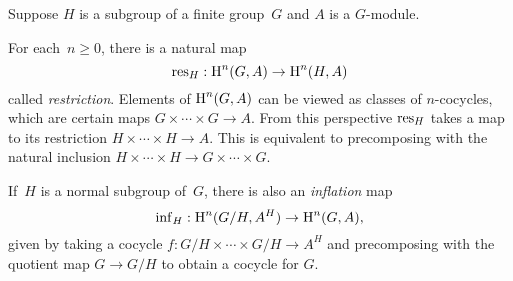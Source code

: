 Suppose $H$ is a subgroup of a finite group~$G$ and $A$
is a $G$-module.

For each~$n\geq 0$, there is a natural map
$$
	\operatorname{res}_H : \operatorname{H}^n(G,A) \to \operatorname{H}^n(H,A)
$$
called \emph{restriction}. Elements of $\operatorname{H}^n(G,A)$ can be
viewed as classes of $n$-cocycles, which are certain maps
$G \times \cdots \times G \to A$. From this perspective $\operatorname{res}_H$
takes a map to its restriction $H \times \cdots \times H \to A$.
This is equivalent to precomposing with the natural inclusion
$H\times\cdots\times H \to G\times\cdots\times G$.

If~$H$ is a normal subgroup of~$G$, there is also an \emph{inflation} map
$$
	\operatorname{inf}_H: \operatorname{H}^n(G/H, A^H) \to \operatorname{H}^n(G,A),
$$
given by taking a cocycle $f : G/H \times \cdots \times G/H \to A^H$
and precomposing with the quotient map $G\to G/H$ to
obtain a cocycle for $G$.



